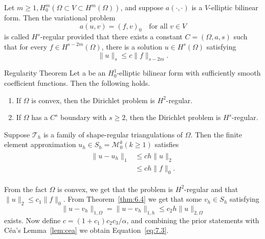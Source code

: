 \begin{defn}
    Let $m\geq 1, H^m_0(\Omega\subset V\subset H^m(\Omega))$, and suppose $a(\cdot,\cdot)$ is a $V$-elliptic bilinear form. 
    Then the variational problem
    \begin{equation}
        a(u,v) = {(f,v)}_0\quad \text{for all } v\in V
    \end{equation}
    is called $H^s$-regular provided that there exists a constant $C=(\Omega,a,s)$ such that for every  $f\in H^{s-2m}(\Omega)$,
    there is a solution $u\in H^s(\Omega)$ satisfying
    \begin{equation}
        \|u\|_s\leq c\|f\|_{s-2m}.
    \end{equation}\label{defn:7.1}
\end{defn}

\begin{thmx}{Regularity Theorem}
    Let a be an $H^1_0$-elliptic bilinear form with sufficiently smooth coefficient functions. Then the following holds. 
    \begin{enumerate}
        \item If $\Omega$ is convex, then the Dirichlet problem is $H^2$-regular. 
        \item If $\Omega$ has a $C^s$ boundary with $s\geq 2$, then the Dirichlet problem is $H^s$-regular.
    \end{enumerate}
\end{thmx}

\begin{thmx}{\quad}
    Suppose $\mathcal{T}_h$ is a family of shape-regular triangulations of $\Omega$. Then the finite element approximation $u_h\in S_h = \mathcal{M}^k_0(k\geq 1)$ satisfies
    \begin{align}
        \begin{split}
            \|u-u_h\|_1&\leq ch\|u\|_2\ \\
            &\leq ch\|f\|_0.
        \end{split}
        \label{eq:7.3}
    \end{align}\label{thm:7.3}
\end{thmx}
\begin{bev}
    From the fact $\Omega$ is convex, we get that the problem is $H^2$-regular and that $\|u\|_2 \leq c_1\|f\|_0$.
    From Theorem~\ref{thm:6.4} we get that some $v_h\in S_h$ satisfying 
    \begin{equation}
    \|u-v_h\|_{1,\Omega} = \|u-v_h\|_{1,h} \leq c_2h\|u\|_{2,\Omega}
    \end{equation}
    exists. Now define $c = (1+c_1)c_2c_3/\alpha$, and combining the prior statements with Céa's Lemma~\ref{lem:cea} we obtain Equation~\ref{eq:7.3}.
\end{bev}